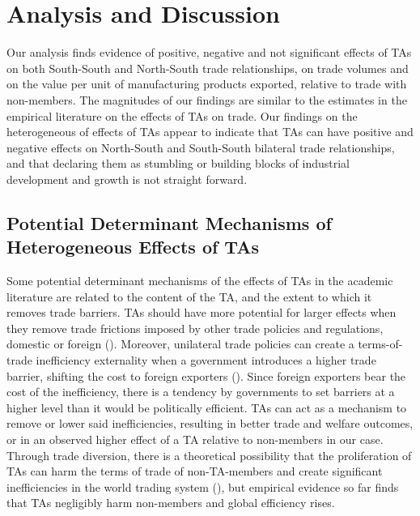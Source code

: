 \section{Analysis and Discussion}%
\label{sec:AnalysisandDiscussion}%
Our analysis finds evidence of positive, negative and not significant effects of TAs on both South{-}South and North{-}South trade relationships, on trade volumes and on the value per unit of manufacturing products exported, relative to trade with non{-}members. The magnitudes of our findings are similar to the estimates in the empirical literature on the effects of TAs on trade. Our findings on the heterogeneous of effects of TAs appear to indicate that TAs can have positive and negative effects on North{-}South and South{-}South bilateral trade relationships, and that declaring them as stumbling or building blocks of industrial development and growth is not straight forward.%
\subsection{Potential Determinant Mechanisms of Heterogeneous Effects of TAs }%
\label{subsec:PotentialDeterminantMechanismsofHeterogeneousEffectsofTAs}%
Some potential determinant mechanisms of the effects of TAs in the
academic literature are related to the content of the TA, and the extent
to which it removes trade barriers. TAs should have more potential for
larger effects when they remove trade frictions imposed by other trade
policies and regulations, domestic or foreign (\cite{baier_widely_2019}).
Moreover, unilateral trade policies can create a terms-of-trade
inefficiency externality when a government introduces a higher trade
barrier, shifting the cost to foreign exporters (\cite{bagwell_economic_1999}). Since foreign exporters bear the cost of the inefficiency, there
is a tendency by governments to set barriers at a higher level than it
would be politically efficient. TAs can act as a mechanism to remove or
lower said inefficiencies, resulting in better trade and welfare
outcomes, or in an observed higher effect of a TA relative to
non-members in our case. Through trade diversion, there is a theoretical
possibility that the proliferation of TAs can harm the terms of trade of
non-TA-members and create significant inefficiencies in the world
trading system (\cite{anderson_terms_2016}), but empirical evidence so far
finds that TAs negligibly harm non-members and global efficiency rises.

